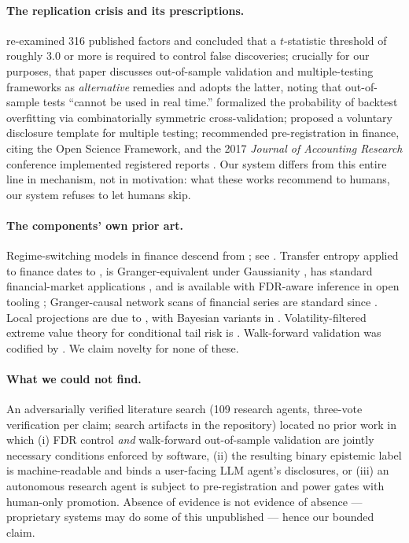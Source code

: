 \documentclass[11pt]{article}
\begin{document}
\paragraph{The replication crisis and its prescriptions.}
\citet{harvey2016and} re-examined 316 published factors and concluded
that a $t$-statistic threshold of roughly 3.0 or more is required to
control false discoveries; crucially for our purposes, that paper
discusses out-of-sample validation and multiple-testing frameworks as
\emph{alternative} remedies and adopts the latter, noting that
out-of-sample tests ``cannot be used in real time.''
\citet{bailey2017probability} formalized the probability of backtest
overfitting via combinatorially symmetric cross-validation;
\citet{fabozzi2018being} proposed a voluntary disclosure template for
multiple testing; \citet{harvey2017presidential} recommended
pre-registration in finance, citing the Open Science Framework, and the
2017 \emph{Journal of Accounting Research} conference implemented
registered reports \citep{bloomfield2018gathering}. Our system differs
from this entire line in mechanism, not in motivation: what these works
recommend to humans, our system refuses to let humans skip.

\paragraph{The components' own prior art.} Regime-switching models in
finance descend from \citet{hamilton1989new}; see
\citet{ang2012regime, nystrup2018dynamic}. Transfer entropy
\citep{schreiber2000measuring} applied to finance dates to
\citet{marschinski2002analysing}, is Granger-equivalent under
Gaussianity \citep{barnett2009granger}, has standard financial-market
applications \citep{dimpfl2013using}, and is available with FDR-aware
inference in open tooling \citep{wollstadt2019idtxl}; Granger-causal
network scans of financial series are standard since
\citet{billio2012econometric}. Local projections are due to
\citet{jorda2005estimation}, with Bayesian variants in
\citet{ferreira2023bayesian}. Volatility-filtered extreme value theory
for conditional tail risk is \citet{mcneil2000estimation}.
Walk-forward validation was codified by \citet{pardo1992design}. We
claim novelty for none of these.

\paragraph{What we could not find.} An adversarially verified literature
search (109 research agents, three-vote verification per claim; search
artifacts in the repository) located no prior work in which (i)
FDR control \emph{and} walk-forward out-of-sample validation are jointly
necessary conditions enforced by software, (ii) the resulting binary
epistemic label is machine-readable and binds a user-facing LLM agent's
disclosures, or (iii) an autonomous research agent is subject to
pre-registration and power gates with human-only promotion. Absence of
evidence is not evidence of absence --- proprietary systems may do some
of this unpublished --- hence our bounded claim.
\end{document}
